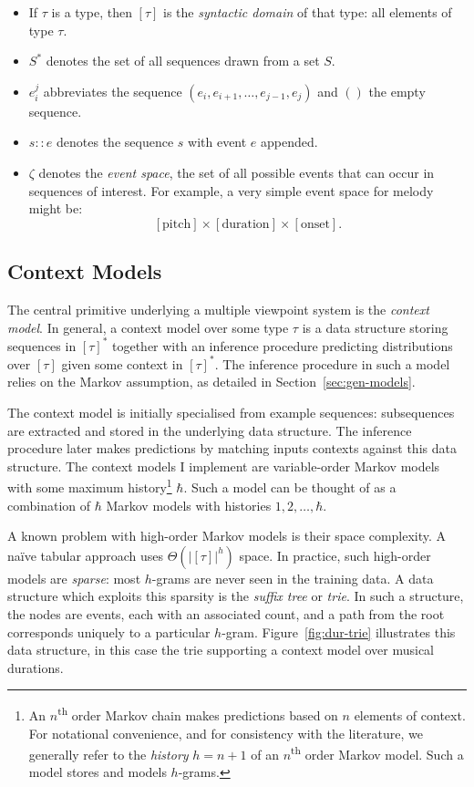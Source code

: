 \documentclass[12pt,a4paper,twoside,openright]{report}
\begin{document}
\begin{itemize}[itemsep=0mm]
  \item If $\tau$ is a type, then $[\tau]$ is the \emph{syntactic domain} of
    that type: all elements of type $\tau$.   
  \item $S^*$ denotes the set of all sequences drawn from a set $S$.
  \item $e_i^j$ abbreviates the sequence $(e_i,e_{i+1},\ldots,e_{j-1},e_j)$ and
    $()$ the empty sequence.
  \item $s :: e$ denotes the sequence $s$ with event $e$ appended.
  \item $\zeta$ denotes the \emph{event space}, the set of all possible events
    that can occur in sequences of interest. For example, a very simple event
    space for melody might be:
    $$ [\mathrm{pitch}] \times [\mathrm{duration}] \times [\mathrm{onset}]. $$
\end{itemize}

\subsection{Context Models}\label{sec:ctx-model-prep}

The central primitive underlying a multiple viewpoint system is the
\emph{context model}. In general, a context model over some type $\tau$ is a
data structure storing sequences in $[\tau]^*$ together with an inference
procedure predicting distributions over $[\tau]$ given some context in
$[\tau]^*$. The inference procedure in such a model relies on the Markov
assumption, as detailed in Section~\ref{sec:gen-models}.

The context model is initially specialised from example sequences: subsequences
are extracted and stored in the underlying data structure. The inference
procedure later makes predictions by matching inputs contexts against this data
structure. The context models I implement are variable-order Markov models with
some maximum history\footnote{ An $n$\textsuperscript{th} order Markov chain
  makes predictions based on $n$ elements of context. For notational
  convenience, and for consistency with the literature, we generally refer to
  the \emph{history} $h = n+1$ of an $n$\textsuperscript{th} order Markov model.
Such a model stores and models $h$-grams.  } $\hbar$. Such a model can be
thought of as a combination of $\hbar$ Markov models with histories
$1,2,\ldots,\hbar$. 

A known problem with high-order Markov models is their space complexity. A naïve
tabular approach uses $\Theta(|[\tau]|^h)$ space.  In practice, such high-order
models are \emph{sparse}: most $h$-grams are never seen in the training data. A
data structure which exploits this sparsity is the \emph{suffix tree} or
\emph{trie}.  In such a structure, the nodes are events, each with an associated
count, and a path from the root corresponds uniquely to a particular $h$-gram.
Figure~\ref{fig:dur-trie} illustrates this data structure, in this case the trie
supporting a context model over musical durations. 
\end{document}
